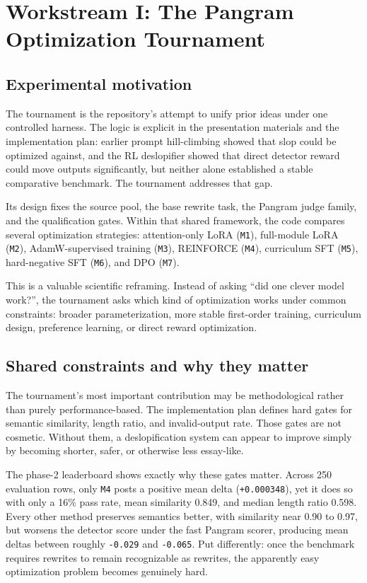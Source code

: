 \documentclass[11pt]{article}
\begin{document}
\section{Workstream I: The Pangram Optimization Tournament}

\subsection{Experimental motivation}

The tournament is the repository's attempt to unify prior ideas under one controlled harness. The logic is explicit in the presentation materials and the implementation plan: earlier prompt hill-climbing showed that slop could be optimized against, and the RL deslopifier showed that direct detector reward could move outputs significantly, but neither alone established a stable comparative benchmark. The tournament addresses that gap.

Its design fixes the source pool, the base rewrite task, the Pangram judge family, and the qualification gates. Within that shared framework, the code compares several optimization strategies: attention-only LoRA (\texttt{M1}), full-module LoRA (\texttt{M2}), AdamW-supervised training (\texttt{M3}), REINFORCE (\texttt{M4}), curriculum SFT (\texttt{M5}), hard-negative SFT (\texttt{M6}), and DPO (\texttt{M7}).

This is a valuable scientific reframing. Instead of asking ``did one clever model work?'', the tournament asks which kind of optimization works under common constraints: broader parameterization, more stable first-order training, curriculum design, preference learning, or direct reward optimization.

\subsection{Shared constraints and why they matter}

The tournament's most important contribution may be methodological rather than purely performance-based. The implementation plan defines hard gates for semantic similarity, length ratio, and invalid-output rate. Those gates are not cosmetic. Without them, a deslopification system can appear to improve simply by becoming shorter, safer, or otherwise less essay-like.

The phase-2 leaderboard shows exactly why these gates matter. Across 250 evaluation rows, only \texttt{M4} posts a positive mean delta (\texttt{+0.000348}), yet it does so with only a 16\% pass rate, mean similarity 0.849, and median length ratio 0.598. Every other method preserves semantics better, with similarity near 0.90 to 0.97, but worsens the detector score under the fast Pangram scorer, producing mean deltas between roughly \texttt{-0.029} and \texttt{-0.065}. Put differently: once the benchmark requires rewrites to remain recognizable as rewrites, the apparently easy optimization problem becomes genuinely hard.
\end{document}
